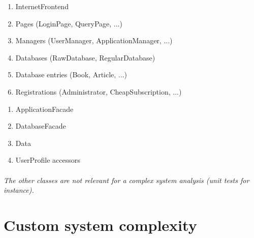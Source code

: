 \begin{minipage}{0.7\textwidth}
  \begin{enumerate}
    \item InternetFrontend
    \item Pages (LoginPage, QueryPage, ...)
    \item Managers (UserManager, ApplicationManager, ...)
    \item Databases (RawDatabase, RegularDatabase)
    \item Database entries (Book, Article, ...)
    \item Registrations (Administrator, CheapSubscription, ...)
  \end{enumerate}
\end{minipage}\hfill
\begin{minipage}{0.3\textwidth}
  \begin{enumerate}[label=\alph*]
    \item ApplicationFacade
    \item DatabaseFacade
    \item Data
    \item UserProfile accessors
  \end{enumerate}
\end{minipage}

\paragraph*{}\textit{The other classes are not relevant for a complex system analysis (unit tests for instance).}

\section{Custom system complexity}
